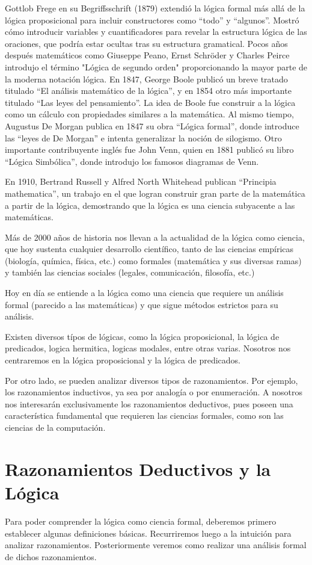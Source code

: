 Gottlob Frege en su Begriffsschrift (1879) extendió la lógica formal más allá
de la lógica proposicional para incluir constructores como ``todo'' y 
``algunos''. Mostró cómo introducir variables y cuantificadores para revelar
la estructura lógica de las oraciones, que podría estar ocultas tras su 
estructura gramatical. Pocos años después matemáticos como Giuseppe Peano,
Ernst Schröder y Charles Peirce introdujo el término "Lógica de segundo orden" 
proporcionando la mayor parte de la moderna notación lógica. En 1847, George 
Boole publicó un breve tratado titulado ``El análisis matemático de la 
lógica'', y en 1854 otro más importante titulado ``Las leyes del 
pensamiento''. La idea de Boole fue construir a la lógica como un cálculo con 
propiedades similares a la matemática. Al mismo tiempo, Augustus De Morgan 
publica en 1847 su obra ``Lógica formal'', donde introduce las ``leyes de De 
Morgan'' e intenta generalizar la noción de silogismo. Otro importante 
contribuyente inglés fue John Venn, quien en 1881 publicó su libro ``Lógica 
Simbólica'', donde introdujo los famosos diagramas de Venn.

En 1910, Bertrand Russell y Alfred North Whitehead publican ``Principia 
mathematica'', un trabajo en el que logran construir gran parte de la 
matemática a partir de la lógica, demostrando que la lógica es una ciencia
subyacente a las matemáticas.

Más de 2000 años de historia nos llevan a la actualidad de la lógica
como ciencia, que hoy sustenta cualquier desarrollo científico, tanto de las ciencias empíricas (biología, química, física, etc.) como formales (matemática y sus diversas ramas) y también las ciencias sociales (legales, comunicación, filosofía, etc.)

Hoy en día se entiende a la lógica como una ciencia que requiere un análisis formal (parecido a las matemáticas) y que sigue métodos estrictos para su análisis.

Existen diversos típos de lógicas, como la lógica proposicional, la lógica de 
predicados, logica hermitica, logicas modales, entre otras varias. Nosotros nos
centraremos en la lógica proposicional y la lógica de predicados.

Por otro lado, se pueden analizar diversos tipos de razonamientos. Por ejemplo,
los razonamientos inductivos, ya sea por analogía o por enumeración. A 
nosotros nos interesarán exclusivamente los razonamientos deductivos, pues 
poseen una característica fundamental que requieren las ciencias formales, 
como son las ciencias de la computación.

\section{Razonamientos Deductivos y la Lógica}

Para poder comprender la lógica como ciencia formal, deberemos primero 
establecer algunas definiciones básicas. Recurriremos luego a la intuición 
para analizar razonamientos. Posteriormente veremos como realizar una análisis 
formal de dichos razonamientos.

